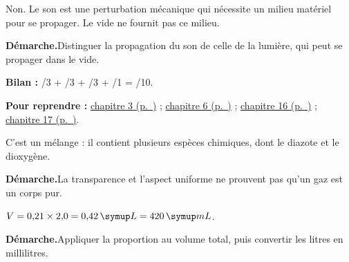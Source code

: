 \par\noindent\begin{minipage}{\linewidth}Non. Le son est une perturbation mécanique qui nécessite un milieu matériel pour se propager. Le vide ne fournit pas ce milieu.\par\smallskip\textbf{Démarche.}\enspace Distinguer la propagation du son de celle de la lumière, qui peut se propager dans le vide.\par{}\end{minipage}\par
{}
\par\noindent\begin{minipage}{\linewidth}{\small\textbf{Bilan :} /3 + /3 + /3 + /1 = /10.\par\textbf{Pour reprendre :} \hyperref[chap-3]{chapitre 3 (p.~\pageref*{chap-3})} ; \hyperref[chap-6]{chapitre 6 (p.~\pageref*{chap-6})} ; \hyperref[chap-16]{chapitre 16 (p.~\pageref*{chap-16})} ; \hyperref[chap-17]{chapitre 17 (p.~\pageref*{chap-17})}.\par}\end{minipage}\par
{}
\label{cor-ann-13}
\par\noindent\begin{minipage}{\linewidth}C’est un mélange : il contient plusieurs espèces chimiques, dont le diazote et le dioxygène.\par\smallskip\textbf{Démarche.}\enspace La transparence et l’aspect uniforme ne prouvent pas qu’un gaz est un corps pur.\par{}\end{minipage}\par
\par\noindent\begin{minipage}{\linewidth}$V=0{,}21\times2{,}0=0{,}42\unite L=420\unite{mL}$.\par\smallskip\textbf{Démarche.}\enspace Appliquer la proportion au volume total, puis convertir les litres en millilitres.\par{}\end{minipage}\par
